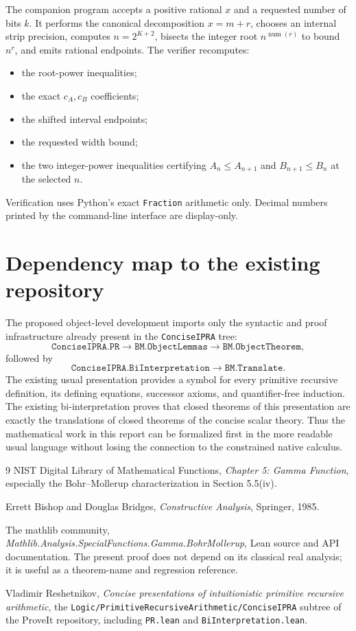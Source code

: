 \documentclass[11pt]{article}
\newcommand{\code}[1]{\texttt{#1}}
\begin{document}
The companion program accepts a positive rational $x$ and a requested number
of bits $k$.  It performs the canonical decomposition $x=m+r$, chooses an
internal strip precision, computes $n=2^{K+2}$, bisects the integer root
$n^{\operatorname{num}(r)}$ to bound $n^r$, and emits rational endpoints.
The verifier recomputes:
\begin{itemize}
\item the root-power inequalities;
\item the exact $c_A,c_B$ coefficients;
\item the shifted interval endpoints;
\item the requested width bound;
\item the two integer-power inequalities certifying $A_n\le A_{n+1}$ and
$B_{n+1}\le B_n$ at the selected $n$.
\end{itemize}
Verification uses Python's exact \code{Fraction} arithmetic only.  Decimal
numbers printed by the command-line interface are display-only.

\section{Dependency map to the existing repository}

The proposed object-level development imports only the syntactic and proof
infrastructure already present in the \code{ConciseIPRA} tree:
\[
 \code{ConciseIPRA.PR}
 \longrightarrow \code{BM.ObjectLemmas}
 \longrightarrow \code{BM.ObjectTheorem},
\]
followed by
\[
 \code{ConciseIPRA.BiInterpretation}
 \longrightarrow \code{BM.Translate}.
\]
The existing usual presentation provides a symbol for every primitive
recursive definition, its defining equations, successor axioms, and
quantifier-free induction.  The existing bi-interpretation proves that closed
theorems of this presentation are exactly the translations of closed theorems
of the concise scalar theory.  Thus the mathematical work in this report can
be formalized first in the more readable usual language without losing the
connection to the constrained native calculus.

\begin{thebibliography}{9}
NIST Digital Library of Mathematical Functions,
\emph{Chapter 5: Gamma Function}, especially the Bohr--Mollerup
characterization in Section 5.5(iv).

Errett Bishop and Douglas Bridges,
\emph{Constructive Analysis}, Springer, 1985.

The mathlib community,
\emph{Mathlib.Analysis.SpecialFunctions.Gamma.BohrMollerup}, Lean source and
API documentation.  The present proof does not depend on its classical real
analysis; it is useful as a theorem-name and regression reference.

Vladimir Reshetnikov,
\emph{Concise presentations of intuitionistic primitive recursive
arithmetic}, the \code{Logic/PrimitiveRecursiveArithmetic/ConciseIPRA}
subtree of the ProveIt repository, including \code{PR.lean} and
\code{BiInterpretation.lean}.
\end{thebibliography}
\end{document}
